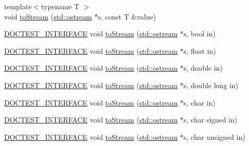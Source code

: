 \begin{DoxyCompactItemize}
\item 
{\footnotesize template$<$typename T $>$ }\\void \hyperlink{namespacedoctest_1_1detail_a71b40611173c82709726b36715229179}{to\+Stream} (\hyperlink{doctest_8h_a116af65cb5e924b33ad9d9ecd7a783f3}{std\+::ostream} $\ast$s, const T \&value)
\item 
\hyperlink{doctest_8h_a9c16ffc635ec47f07797d21ede26b1a5}{D\+O\+C\+T\+E\+S\+T\+\_\+\+I\+N\+T\+E\+R\+F\+A\+CE} void \hyperlink{namespacedoctest_1_1detail_a54f817dd0c3e33a4f96de3e638d4c559}{to\+Stream} (\hyperlink{doctest_8h_a116af65cb5e924b33ad9d9ecd7a783f3}{std\+::ostream} $\ast$s, bool in)
\item 
\hyperlink{doctest_8h_a9c16ffc635ec47f07797d21ede26b1a5}{D\+O\+C\+T\+E\+S\+T\+\_\+\+I\+N\+T\+E\+R\+F\+A\+CE} void \hyperlink{namespacedoctest_1_1detail_ac0ab7be576543b52b480df7f44ee13c5}{to\+Stream} (\hyperlink{doctest_8h_a116af65cb5e924b33ad9d9ecd7a783f3}{std\+::ostream} $\ast$s, float in)
\item 
\hyperlink{doctest_8h_a9c16ffc635ec47f07797d21ede26b1a5}{D\+O\+C\+T\+E\+S\+T\+\_\+\+I\+N\+T\+E\+R\+F\+A\+CE} void \hyperlink{namespacedoctest_1_1detail_aa0aa6b2f4cd2ab8cc0b5c4c6a1745e05}{to\+Stream} (\hyperlink{doctest_8h_a116af65cb5e924b33ad9d9ecd7a783f3}{std\+::ostream} $\ast$s, double in)
\item 
\hyperlink{doctest_8h_a9c16ffc635ec47f07797d21ede26b1a5}{D\+O\+C\+T\+E\+S\+T\+\_\+\+I\+N\+T\+E\+R\+F\+A\+CE} void \hyperlink{namespacedoctest_1_1detail_aa7f9d8383116a268a72993244a43d74d}{to\+Stream} (\hyperlink{doctest_8h_a116af65cb5e924b33ad9d9ecd7a783f3}{std\+::ostream} $\ast$s, double long in)
\item 
\hyperlink{doctest_8h_a9c16ffc635ec47f07797d21ede26b1a5}{D\+O\+C\+T\+E\+S\+T\+\_\+\+I\+N\+T\+E\+R\+F\+A\+CE} void \hyperlink{namespacedoctest_1_1detail_aee32c9e6a9e1b419c6feb44e8c1b6205}{to\+Stream} (\hyperlink{doctest_8h_a116af65cb5e924b33ad9d9ecd7a783f3}{std\+::ostream} $\ast$s, char in)
\item 
\hyperlink{doctest_8h_a9c16ffc635ec47f07797d21ede26b1a5}{D\+O\+C\+T\+E\+S\+T\+\_\+\+I\+N\+T\+E\+R\+F\+A\+CE} void \hyperlink{namespacedoctest_1_1detail_aba277e0f00b9cf14b7161bbe033b126f}{to\+Stream} (\hyperlink{doctest_8h_a116af65cb5e924b33ad9d9ecd7a783f3}{std\+::ostream} $\ast$s, char signed in)
\item 
\hyperlink{doctest_8h_a9c16ffc635ec47f07797d21ede26b1a5}{D\+O\+C\+T\+E\+S\+T\+\_\+\+I\+N\+T\+E\+R\+F\+A\+CE} void \hyperlink{namespacedoctest_1_1detail_a23f8f4324507a40de4fb636f20f36fb7}{to\+Stream} (\hyperlink{doctest_8h_a116af65cb5e924b33ad9d9ecd7a783f3}{std\+::ostream} $\ast$s, char unsigned in)

\end{DoxyCompactItemize}
